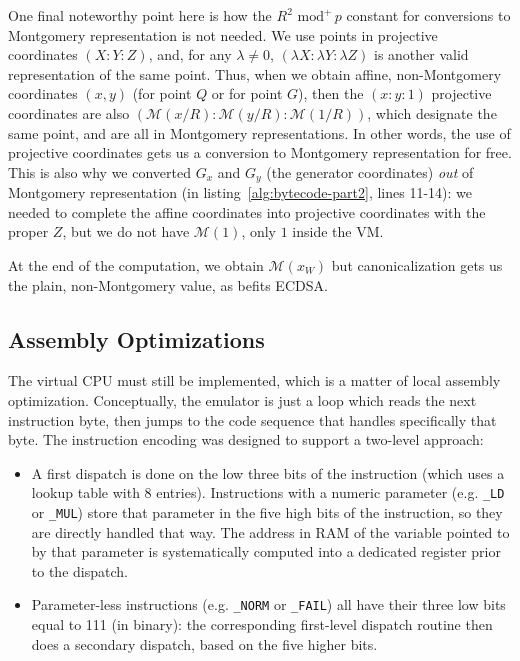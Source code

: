 \documentclass{llncs}
\newcommand{\umod}[2]{#1 \,\,\text{mod}^{+}\, #2}
\newcommand{\mont}[1]{\mathcal{M}(#1)}
\begin{document}
One final noteworthy point here is how the $\umod{R^2}{p}$ constant for
conversions to Montgomery representation is not needed. We use points in
projective coordinates $(X{:}Y{:}Z)$, and, for any $\lambda \neq 0$,
$(\lambda X{:}\lambda Y{:}\lambda Z)$ is another valid representation of
the same point. Thus, when we obtain affine, non-Montgomery coordinates
$(x,y)$ (for point $Q$ or for point $G$), then the $(x{:}y{:}1)$
projective coordinates are also $(\mont{x/R}:\mont{y/R}:\mont{1/R})$,
which designate the same point, and are all in Montgomery
representations. In other words, the use of projective coordinates gets
us a conversion to Montgomery representation for free. This is also why
we converted $G_x$ and $G_y$ (the generator coordinates) \emph{out} of
Montgomery representation (in listing~\ref{alg:bytecode-part2}, lines
11-14): we needed to complete the affine coordinates into projective
coordinates with the proper $Z$, but we do not have $\mont{1}$, only $1$
inside the VM.

At the end of the computation, we obtain $\mont{x_W}$ but canonicalization
gets us the plain, non-Montgomery value, as befits ECDSA.

\subsection{Assembly Optimizations}

The virtual CPU must still be implemented, which is a matter of local
assembly optimization. Conceptually, the emulator is just a loop which
reads the next instruction byte, then jumps to the code sequence that
handles specifically that byte. The instruction encoding was designed
to support a two-level approach:
\begin{itemize}

    \item A first dispatch is done on the low three bits of the
    instruction (which uses a lookup table with 8 entries). Instructions
    with a numeric parameter (e.g. \verb+_LD+ or \verb+_MUL+) store that
    parameter in the five high bits of the instruction, so they are
    directly handled that way. The address in RAM of the variable
    pointed to by that parameter is systematically computed into a
    dedicated register prior to the dispatch.

    \item Parameter-less instructions (e.g. \verb+_NORM+ or \verb+_FAIL+)
    all have their three low bits equal to 111 (in binary): the corresponding
    first-level dispatch routine then does a secondary dispatch, based on
    the five higher bits.

\end{itemize}
\end{document}
